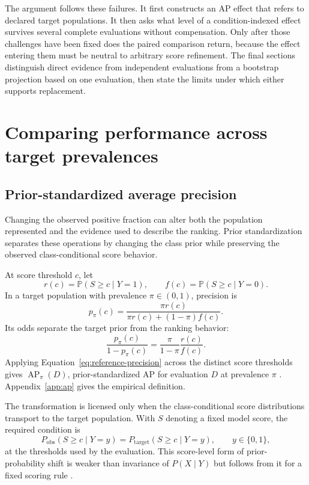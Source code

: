 \documentclass[11pt]{article}
\newcommand{\AP}{\operatorname{AP}}
\newcommand{\Prb}{\mathbb{P}}
\theoremstyle{remark}
\begin{document}
The argument follows these failures. It first constructs an AP effect that refers to declared target populations. It then asks what level of a condition-indexed effect survives several complete evaluations without compensation. Only after those challenges have been fixed does the paired comparison return, because the effect entering them must be neutral to arbitrary score refinement. The final sections distinguish direct evidence from independent evaluations from a bootstrap projection based on one evaluation, then state the limits under which either supports replacement.

\section{Comparing performance across target prevalences}
\label{sec:prevalence}

\subsection{Prior-standardized average precision}

Changing the observed positive fraction can alter both the population represented and the evidence used to describe the ranking. Prior standardization separates these operations by changing the class prior while preserving the observed class-conditional score behavior.

At score threshold $c$, let
\[
r(c)=\Prb(S\geq c\mid Y=1),
\qquad
f(c)=\Prb(S\geq c\mid Y=0).
\]
In a target population with prevalence $\pi\in(0,1)$, precision is
\begin{equation}
p_\pi(c)
=
\frac{\pi r(c)}
{\pi r(c)+(1-\pi)f(c)}.
\label{eq:reference-precision}
\end{equation}
Its odds separate the target prior from the ranking behavior:
\begin{equation}
\frac{p_\pi(c)}{1-p_\pi(c)}
=
\frac{\pi}{1-\pi}\frac{r(c)}{f(c)}.
\label{eq:precision-odds}
\end{equation}
Applying Equation~\eqref{eq:reference-precision} across the distinct score thresholds gives $\AP_\pi(D)$, prior-standardized AP for evaluation $D$ at prevalence $\pi$ \cite{elkan2001foundations,siblini2020calibration}. Appendix~\ref{app:ap} gives the empirical definition.

The transformation is licensed only when the class-conditional score distributions transport to the target population. With $S$ denoting a fixed model score, the required condition is
\begin{equation}
P_{\mathrm{obs}}(S\geq c\mid Y=y)
=
P_{\mathrm{target}}(S\geq c\mid Y=y),
\qquad y\in\{0,1\},
\label{eq:score-invariance}
\end{equation}
at the thresholds used by the evaluation. This score-level form of prior-probability shift is weaker than invariance of $P(X\mid Y)$ but follows from it for a fixed scoring rule \cite{saerens2002adjusting,storkey2009training,lipton2018detecting}.
\end{document}
